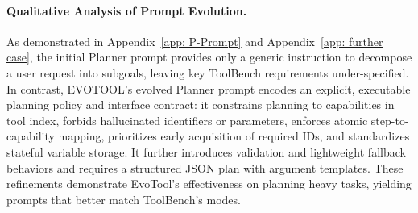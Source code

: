 \documentclass[11pt]{article}
\begin{document}
{\paragraph{Qualitative Analysis of Prompt Evolution.} As demonstrated in Appendix~\ref{app: P-Prompt} and Appendix~\ref{app: further case}, the initial Planner prompt provides only a generic instruction to decompose a user request into subgoals, leaving key ToolBench requirements under-specified. In contrast, EVOTOOL’s evolved Planner prompt encodes an explicit, executable planning policy and interface contract: it constrains planning to capabilities in tool index, forbids hallucinated identifiers or parameters, enforces atomic step-to-capability mapping, prioritizes early acquisition of required IDs, and standardizes stateful variable storage. It further introduces validation and lightweight fallback behaviors and requires a structured JSON plan with argument templates. These refinements demonstrate EvoTool’s effectiveness on planning heavy tasks, yielding prompts that better match ToolBench’s modes.






















}
\end{document}
